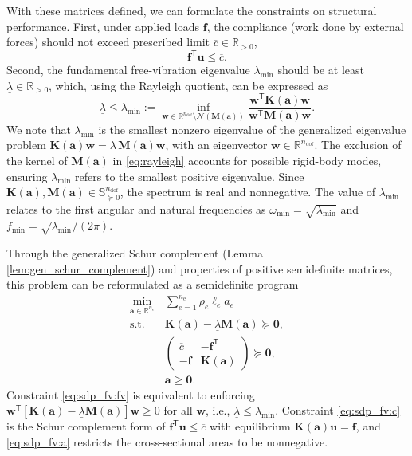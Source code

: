 \documentclass[preprint,3p]{elsarticle}
\newcommand{\T}{^{\mathsf T}}
\newcommand{\nel}{n_\mathrm{e}}
\newcommand{\ndof}{n_\mathrm{dof}}
\newcommand{\kernel}[1]{\ensuremath{\mathcal{N}\!\left(#1\right)}}
\numberwithin{equation}{section}
\begin{document}
With these matrices defined, we can formulate the constraints on structural performance. First, under applied loads $\mathbf{f}$, the compliance (work done by external forces) should not exceed prescribed limit $\overline{c} \in \mathbb{R}_{> 0}$,
%
\begin{equation}
  \mathbf{f}\T \mathbf{u} \leq \overline{c}.
\end{equation}
%
Second, the fundamental free-vibration eigenvalue $\lambda_{\min}$ should be at least $\underline{\lambda} \in \mathbb{R}_{> 0}$, which, using the Rayleigh quotient, can be expressed as
%
\begin{equation}\label{eq:rayleigh}
  \underline{\lambda} \leq \lambda_{\min} := \inf_{\mathbf{w} \in \mathbb{R}^{\ndof} \setminus \kernel{\mathbf{M}(\mathbf{a})}}\frac{\mathbf{w}\T \mathbf{K}(\mathbf{a})\mathbf{w}}{\mathbf{w}\T \mathbf{M}(\mathbf{a})\mathbf{w}}.
\end{equation}
%
We note that $\lambda_{\min}$ is the smallest nonzero eigenvalue of the generalized eigenvalue problem $\mathbf{K}(\mathbf{a})\mathbf{w}=\lambda\,\mathbf{M}(\mathbf{a})\mathbf{w}$, with an eigenvector $\mathbf{w}\in\mathbb{R}^{\ndof}$. The exclusion of the kernel of $\mathbf{M}(\mathbf{a})$ in \eqref{eq:rayleigh} accounts for possible rigid-body modes, ensuring $\lambda_{\min}$ refers to the smallest positive eigenvalue. Since $\mathbf{K}(\mathbf{a}),\mathbf{M}(\mathbf{a})\in\mathbb{S}^{\ndof}_{\succeq 0}$, the spectrum is real and nonnegative. The value of $\lambda_{\min}$ relates to the first angular and natural frequencies as $\omega_{\min}=\sqrt{\lambda_{\min}}$ and $f_{\min}=\sqrt{\lambda_{\min}}/(2\pi)$. 

Through the generalized Schur complement (Lemma \ref{lem:gen_schur_complement}) and properties of positive semidefinite matrices, this problem can be reformulated as a semidefinite program \citep{Achtziger2008,Tyburec2024global}
%
\begin{subequations}\label{eq:sdp_fv}
  \begin{align}
    \min_{\mathbf{a} \in \mathbb{R}^{\nel}} & \sum_{e=1}^{\nel} \rho_e \ell_e a_e \\
    \text{s.t.} \quad & \mathbf{K}(\mathbf{a}) - \underline{\lambda} \mathbf{M}(\mathbf{a}) \succeq \mathbf{0},\label{eq:sdp_fv:fv}\\
    &
    \begin{pmatrix} \overline{c} & -\mathbf{f}\T \\ -\mathbf{f} & \mathbf{K}(\mathbf{a})
    \end{pmatrix} \succeq \mathbf{0},\label{eq:sdp_fv:c}\\
    & \mathbf{a} \ge \mathbf{0}.\label{eq:sdp_fv:a}
  \end{align}
\end{subequations}
%
Constraint \eqref{eq:sdp_fv:fv} is equivalent to enforcing $\mathbf{w}\T \left[\mathbf{K}(\mathbf{a})-\underline{\lambda}\mathbf{M}(\mathbf{a})\right] \mathbf{w}\ge 0$ for all $\mathbf{w}$, i.e., $\underline{\lambda}\le \lambda_{\min}$. Constraint \eqref{eq:sdp_fv:c} is the Schur complement form of $\mathbf{f}\T\mathbf{u}\le \overline{c}$ with equilibrium $\mathbf{K}(\mathbf{a})\mathbf{u}=\mathbf{f}$, and \eqref{eq:sdp_fv:a} restricts the cross-sectional areas to be nonnegative.
\end{document}

